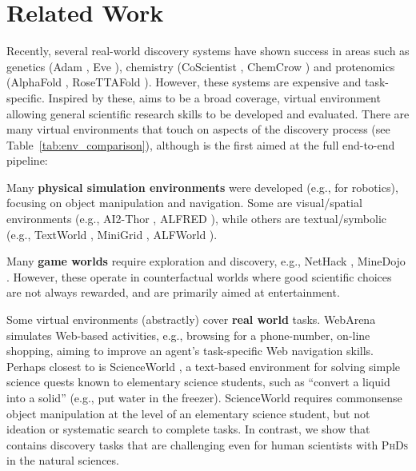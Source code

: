 


\section{Related Work}

Recently, several real-world discovery systems have shown success in areas such as genetics (Adam \citep{King2004FunctionalGH}, Eve \citep{Williams2015CheaperFD}),
chemistry (CoScientist \citep{Boiko2023AutonomousCR}, ChemCrow \citep{Bran2023AugmentingLL}) and protenomics
  (AlphaFold \citep{Jumper2021HighlyAP}, RoseTTAFold \citep{Krishna2023GeneralizedBM}). However, these systems
are expensive and task-specific. Inspired by these, \env aims to be a broad coverage, virtual
environment allowing general scientific research skills to be developed and evaluated.
There are many virtual environments that touch on aspects of the discovery
process (see Table~\ref{tab:env_comparison}), although \env is the first aimed at the full end-to-end pipeline:

Many {\bf physical simulation environments} were developed (e.g., for
robotics), focusing on object manipulation and navigation. Some are
visual/spatial environments (e.g., AI2-Thor \citep{Kolve2017AI2THORAI}, ALFRED \cite{ALFRED20}),
while others are textual/symbolic (e.g., TextWorld \cite{Ct2018TextWorldAL}, MiniGrid \cite{MinigridMiniworld23}, ALFWorld \cite{Shridhar2020ALFWorldAT}).

Many {\bf game worlds} require exploration and discovery, e.g., NetHack \citep{NetHack}, MineDojo \cite{fan2022minedojo}.
However, these operate in counterfactual worlds where good scientific choices
are not always rewarded, and are primarily aimed at entertainment.

Some virtual environments (abstractly) cover {\bf real world} tasks.
WebArena \citep{zhou2024webarena} simulates Web-based activities, e.g., browsing for a phone-number, on-line shopping,
aiming to improve an agent's task-specific Web navigation skills. Perhaps closest
to \env is ScienceWorld \citep{Wang2022ScienceWorldIY}, a text-based environment for solving simple science
quests known to elementary science students, such as ``convert a liquid into a solid'' (e.g., put water in the freezer).
ScienceWorld requires commonsense object manipulation at the level of an elementary science student, but not ideation or systematic search to complete tasks. In contrast, we show that \env contains discovery tasks that are challenging even for human scientists with \textsc{PhDs} in the natural sciences.


